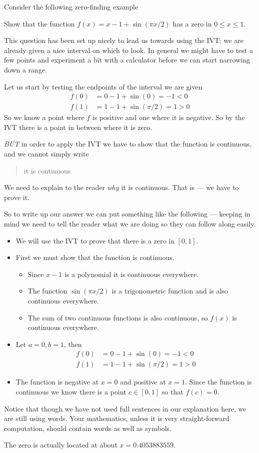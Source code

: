 Consider the following zero-finding example
\begin{eg}
Show that the function $f(x) = x-1+\sin(\pi x/2)$ has a zero
in $0 \leq x \leq 1$.

This question has been set up nicely to lead us towards using the IVT;  we are
already given a nice interval on which to look. In general we might have to
test a few points and experiment a bit with a calculator before we can
start narrowing down a range.

Let us start by testing the endpoints of the interval we are given
\begin{align*}
  f(0) &= 0 - 1 + \sin(0) = -1 < 0 \\
  f(1) &= 1-1+\sin(\pi/2) = 1 > 0
\end{align*}
So we know a point where $f$ is positive and one where it is negative. So by
the IVT there is a point in between where it is zero.

\emph{BUT} in order to apply the IVT we have to show that the function is
continuous, and we cannot simply write
\begin{quote}
 it is continuous
\end{quote}
We need to explain to the reader \emph{why} it is continuous. That is --- we
have to prove it.

So to write up our answer we can put something like the following ---
keeping in mind we need to tell the reader what we are doing so they can follow
along easily.
\begin{itemize}
\item We will use the IVT to prove that there is a zero in $[0,1]$.
\item First we must show that the function is continuous.
\begin{itemize}
\item Since $x-1$ is a polynomial it is continuous everywhere.
\item The function $\sin(\pi x/2)$ is a trigonometric function and is also
continuous everywhere.
\item The sum of two continuous functions is also continuous, so $f(x)$ is
continuous everywhere.
\end{itemize}
\item Let $a=0, b=1$, then
\begin{align*}
  f(0) &= 0 - 1 + \sin(0) = -1 < 0 \\
  f(1) &= 1-1+\sin(\pi/2) = 1 > 0
\end{align*}
\item The function is negative at $x=0$ and positive at $x=1$. Since the
function is continuous we know there is a point $c \in [0,1]$ so that $f(c) =
0$.
 \end{itemize}
Notice that though we have not used full sentences in our explanation here, we
are still using words. Your mathematics, unless it is very straight-forward
computation, should contain words as well as symbols.
\end{eg}
The zero is actually located at about $x=0.4053883559$.

